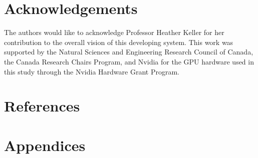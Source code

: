 \documentclass[authoryear]{elsarticle}
\begin{document}
\section*{Acknowledgements}
The authors would like to acknowledge Professor Heather Keller for her contribution to the overall vision of this developing system. This work was supported by the Natural Sciences and Engineering Research Council of Canada, the Canada Research Chairs Program, and Nvidia for the GPU hardware used in this study through the Nvidia Hardware Grant Program.

\section*{References}
%


\newpage
\section*{Appendices}
\setcounter{equation}{0}%
\renewcommand{\theequation}{A.\arabic{equation}}
{}
\renewcommand{\thetable}{A.\arabic{atable}}
{}
\renewcommand{\thefigure}{A.\arabic{afigure}}
\end{document}
